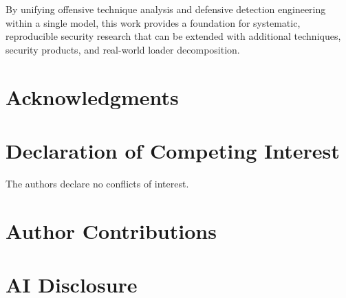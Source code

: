 \documentclass[10pt,a4paper,twocolumn]{article}
\begin{document}
By unifying offensive technique analysis and defensive detection engineering within a single model, this work provides a foundation for systematic, reproducible security research that can be extended with additional techniques, security products, and real-world loader decomposition.

\section*{Acknowledgments}


\section*{Declaration of Competing Interest}

The authors declare no conflicts of interest.

\section*{Author Contributions}


\section*{AI Disclosure}


\end{document}
